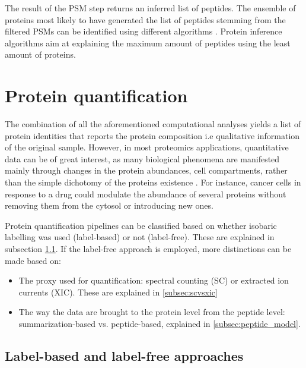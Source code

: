 The result of the PSM step returns an inferred list of peptides. The ensemble of proteins most likely to have generated the list of peptides stemming from the filtered PSMs can be identified using different algorithms \cite{Li2012} \cite{Huang2012}. Protein inference algorithms aim at explaining the maximum amount of peptides using the least amount of proteins.

\section{Protein quantification}
\label{sec:quantification}

The combination of all the aforementioned computational analyses yields a list of protein identities that reports the protein composition i.e qualitative information of the original sample. However, in most proteomics applications, quantitative data can be of great interest, as many biological phenomena are manifested mainly through changes in the protein abundances, cell compartments, rather than the simple dichotomy of the protein\textquotesingle s existence \cite{Barsnes2008}. For instance, cancer cells in response to a drug could modulate the abundance of several proteins without removing them from the cytosol or introducing new ones.

Protein quantification pipelines can be classified based on whether isobaric labelling was used (label-based) or not (label-free). These are explained in subsection \ref{subsec:labelling}. If the label-free approach is employed, more distinctions can be made based on:

\begin{itemize}
\item The proxy used for quantification: spectral counting (\ac{SC}) or extracted ion currents (\ac{XIC}). These are explained in \ref{subsec:scvsxic}


\item The way the data are brought to the protein level from the peptide level: summarization-based vs. peptide-based, explained in \ref{subsec:peptide_model}.
\end{itemize}

\subsection{Label-based and label-free approaches}
\label{subsec:labelling}


